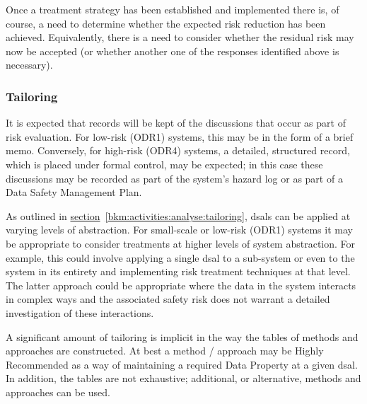 Once a \gls{treatment} strategy has been established and implemented there is, of course, a need to determine whether the expected risk reduction has been achieved. Equivalently, there is a need to consider whether the residual risk may now be accepted (or whether another one of the \glspl{response} identified above is necessary).

\subsubsection{Tailoring}
It is expected that records will be kept of the discussions that occur as part of risk evaluation. For low-risk (ODR1) systems, this may be in the form of a brief memo. Conversely, for high-risk (ODR4) systems, a detailed, structured record, which is placed under formal control, may be expected; in this case these discussions may be recorded as part of the system's \gls{hazard log} or as part of a Data Safety Management Plan.

As outlined in
\hyperref[bkm:activities:analyse:tailoring]{section}~\ref{bkm:activities:analyse:tailoring}, %
\glspl{dsal} can be applied at varying levels of abstraction. For small-scale or low-risk (ODR1) systems it may be appropriate to consider \glspl{treatment} at higher levels of system abstraction. For example, this could involve applying a single \gls{dsal} to a sub-system or even to the system in its entirety and implementing risk \gls{treatment} techniques at that level. The latter approach could be appropriate where the data in the system interacts in complex ways and the associated safety risk does not warrant a detailed investigation of these interactions.

A significant amount of tailoring is implicit in the way the tables of methods and approaches are constructed. At best a method / approach may be Highly Recommended as a way of maintaining a required Data Property at a given \gls{dsal}. In addition, the tables are not exhaustive; additional, or alternative, methods and approaches can be used.
